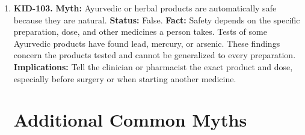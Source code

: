 \documentclass[11pt,oneside]{book}
\begin{document}
\begin{enumerate}[leftmargin=0pt,labelwidth=0pt,labelsep=0pt,itemindent=0pt]
\item[] \textbf{KID-103.} \textbf{Myth:} Ayurvedic or herbal products are automatically safe because they are natural.\newline
\textbf{Status:} False.\newline
\textbf{Fact:} Safety depends on the specific preparation, dose, and other medicines a person takes. Tests of some Ayurvedic products have found lead, mercury, or arsenic. These findings concern the products tested and cannot be generalized to every preparation. \cite{ref115,ref116,ref117}\newline
\textbf{Implications:} Tell the clinician or pharmacist the exact product and dose, especially before surgery or when starting another medicine.

\section{Additional Common Myths}


\end{enumerate}
\end{document}
